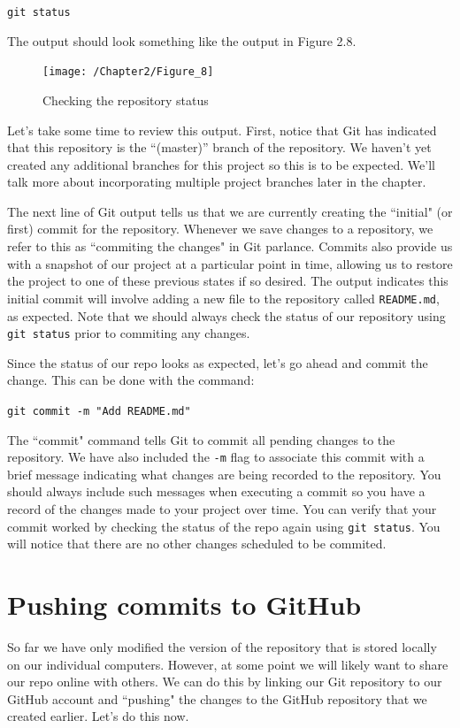 \documentclass{book}
\begin{document}
\texttt{git status}

The output should look something like the output in Figure 2.8. 

\begin{figure}[h]
	\caption{Checking the repository status}
	\centering\texttt{[image: /Chapter2/Figure\_8]}
\end{figure}

Let's take some time to review this output. First, notice that Git has indicated that this repository is the ``(master)'' branch of the repository. We haven't yet created any additional branches for this project so this is to be expected. We'll talk more about incorporating multiple project branches later in the chapter.

The next line of Git output tells us that we are currently creating the ``initial" (or first)  commit for the repository. Whenever we save changes to a repository, we refer to this as ``commiting the changes" in Git parlance. Commits also provide us with a snapshot of our project at a particular point in time, allowing us to restore the project to one of these previous states if so desired. The output indicates this initial commit will involve adding a new file to the repository called \texttt{README.md}, as expected. Note that we should always check the status of our repository using \texttt{git status} prior to commiting any changes.

Since the status of our repo looks as expected, let's go ahead and commit the change. This can be done with the command:

\texttt{git commit -m "Add README.md"}

The ``commit" command tells Git to commit all pending changes to the repository. We have also included the \texttt{-m} flag to associate this commit with a brief message indicating what changes are being recorded to the repository. You should always include such messages when executing a commit so you have a record of the changes made to your project over time. You can verify that your commit worked by checking the status of the repo again using \texttt{git status}. You will notice that there are no other changes scheduled to be commited.

\section{Pushing commits to GitHub}
So far we have only modified the version of the repository that is stored locally on our individual computers. However, at some point we will likely want to share our repo online with others. We can do this by linking our Git repository to our GitHub account and ``pushing" the changes to the GitHub repository that we created earlier. Let's do this now.
\end{document}

